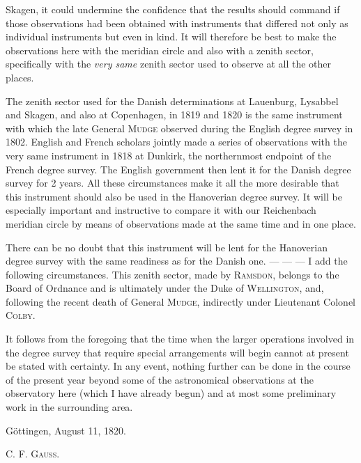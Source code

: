 %
Skagen, it could undermine the confidence that the results should command if those observations had been obtained with instruments that differed not only as individual instruments but even in kind. It will therefore be best to make the observations here with the meridian circle and also with a zenith sector, specifically with the \textit{very same} zenith sector used to observe at all the other places.

The zenith sector used for the Danish determinations at Lauenburg, Lysabbel and Skagen, and also at Copenhagen, in 1819 and 1820 is the same instrument with which the late General \textsc{Mudge} observed during the English degree survey in 1802. English and French scholars jointly made a series of observations with the very same instrument in 1818 at Dunkirk, the northernmost endpoint of the French degree survey. The English government then lent it for the Danish degree survey for 2 years. All these circumstances make it all the more desirable that this instrument should also be used in the Hanoverian degree survey. It will be especially important and instructive to compare it with our Reichenbach meridian circle by means of observations made at the same time and in one place.

There can be no doubt that this instrument will be lent for the Hanoverian degree survey with the same readiness as for the Danish one. — — — I add the following circumstances. This zenith sector, made by \textsc{Ramsdon}, belongs to the Board of Ordnance and is ultimately under the Duke of \textsc{Wellington}, and, following the recent death of General \textsc{Mudge}, indirectly under Lieutenant Colonel \textsc{Colby}.

It follows from the foregoing that the time when the larger operations involved in the degree survey that require special arrangements will begin cannot at present be stated with certainty. In any event, nothing further can be done in the course of the present year beyond some of the astronomical observations at the observatory here (which I have already begun) and at most some preliminary work in the surrounding area.

Göttingen, August 11, 1820.
\begin{flushright}C. F. \textsc{Gauss}.\end{flushright}

